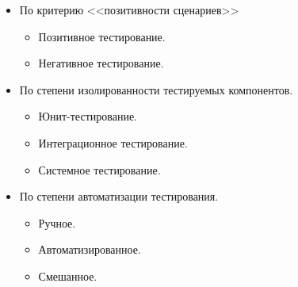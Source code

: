 \begin{Rem}
\begin{itemize}
            \item По критерию <<позитивности сценариев>>
            \begin{itemize}
                \item Позитивное тестирование.
                \item Негативное тестирование.
            \end{itemize}

            \item По степени изолированности тестируемых компонентов.
            \begin{itemize}
                \item Юнит-тестирование.
                \item Интеграционное тестирование.
                \item Системное тестирование.
            \end{itemize}

            \item По степени автоматизации тестирования.
            \begin{itemize}
                \item Ручное.
                \item Автоматизированное.
                \item Смешанное.
            \end{itemize}
        \end{itemize}
    \end{Rem}

